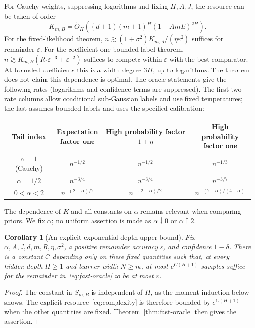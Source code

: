 \documentclass[11pt]{article}
\newtheorem{corollary}[theorem]{Corollary}\newtheorem{proposition}[theorem]{Proposition}
\theoremstyle{remark}\newtheorem{remark}[theorem]{Remark}
\begin{document}
For Cauchy weights, suppressing logarithms and fixing $H,A,J$, the resource can be taken of order
\begin{equation}
 K_{m,B}=\widetilde O_H\!\left((d+1)(m+1)^H(1+AmB)^{2H}\right).
 \label{eq:cauchy-poly}
\end{equation}
For the fixed-likelihood theorem, $n\gtrsim (1+\sigma^2)K_{m,B}/(\eta\varepsilon^2)$ suffices for remainder $\varepsilon$. For the coefficient-one bounded-label theorem, $n\gtrsim K_{m,B}(R_*\varepsilon^{-3}+\varepsilon^{-2})$ suffices to compete within $\varepsilon$ with the best comparator. At bounded coefficients this is a width degree $3H$, up to logarithms. The theorem does not claim this dependence is optimal. The oracle statements give the following rates (logarithms and confidence terms are suppressed). The first two rate columns allow conditional sub-Gaussian labels and use fixed temperatures; the last assumes bounded labels and uses the specified calibration:
\begin{center}
\begin{tabular}{cccc}\toprule
Tail index & \shortstack{Expectation\\factor one} & \shortstack{High probability\\factor $1+\eta$} & \shortstack{High probability\\factor one}\\\midrule
$\alpha=1$ (Cauchy)&$n^{-1/2}$&$n^{-1/2}$&$n^{-1/3}$\\
$\alpha=1/2$&$n^{-3/4}$&$n^{-3/4}$&$n^{-3/7}$\\
$0<\alpha<2$&$n^{-(2-\alpha)/2}$&$n^{-(2-\alpha)/2}$&$n^{-(2-\alpha)/(4-\alpha)}$\\\bottomrule
\end{tabular}
\end{center}
The dependence of $K$ and all constants on $\alpha$ remains relevant when comparing priors. We fix $\alpha$; no uniform assertion is made as $\alpha\downarrow0$ or $\alpha\uparrow2$.

\begin{corollary}[An explicit exponential depth upper bound]\label{cor:depth-upper}
Fix $\alpha,A,J,d,m,B,\eta,\sigma^2$, a positive remainder accuracy $\varepsilon$, and confidence $1-\delta$. There is a constant $C$ depending only on these fixed quantities such that, at every hidden depth $H\ge1$ and learner width $N\ge m$, at most $e^{C(H+1)}$ samples suffice for the remainder in~\eqref{eq:fast-oracle} to be at most $\varepsilon$.
\end{corollary}
\begin{proof}
The constant in $S_{m,B}$ is independent of $H$, as the moment induction below shows. The explicit resource~\eqref{eq:complexity} is therefore bounded by $e^{C(H+1)}$ when the other quantities are fixed. Theorem~\ref{thm:fast-oracle} then gives the assertion.
\end{proof}
\end{document}
